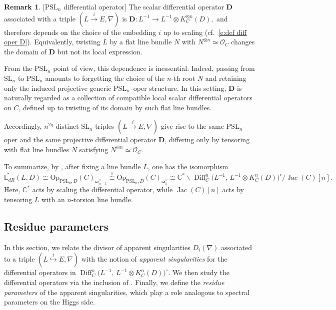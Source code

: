 \documentclass[twoside, 11pt]{article}
\numberwithin{equation}{section}
\theoremstyle{theorem}
\numberwithin{theorem}{section}
\theoremstyle{definition}
\newtheorem{remark}[remark]{Remark}
\begin{document}
\begin{remark}\label{rem-D-PSLn}[$\mathrm{PSL}_n$ differential operator]
The scalar differential operator $\mathbf D$ associated with a triple $(L\xrightarrow{i}E,\nabla)$ is 
\(
\mathbf D: L^{-1}\longrightarrow L^{-1}\otimes K_C^{\otimes n}(D),
\)
and therefore depends on the choice of the embedding $i$ up to scaling (cf.\ \eqref{e:def diff oper D}). Equivalently, twisting $L$ by a flat line bundle $N$ with $N^{\otimes n}\simeq\mathcal O_C$ changes the domain of $\mathbf D$ but not its local expression.

From the $\mathrm{PSL}_n$ point of view, this dependence is inessential. Indeed, passing from $\mathrm{SL}_n$ to $\mathrm{PSL}_n$ amounts to forgetting the choice of the $n$-th root $N$ and retaining only the induced projective generic $\mathrm{PSL}_n$--oper structure. In this setting, $\mathbf D$ is naturally regarded as a collection of compatible local scalar differential operators on $C$, defined up to twisting of its domain by such flat line bundles.

Accordingly, $n^{2g}$ distinct $\mathrm{SL}_n$-triples $(L\xrightarrow{i}E,\nabla)$ give rise to the same $\mathrm{PSL}_n$-oper and the same projective differential operator $\mathbf D$, differing only by tensoring with flat line bundles $N$ satisfying $N^{\otimes n}\simeq\mathcal O_C$.
\end{remark}

To summarize, by , after fixing a line bundle $L$, one has the isomorphism
\begin{equation}\label{e:ident spaces}
\widetilde{\mathbb{L}_{dR}}(L,D)
\cong
\mathrm{Op}_{\mathrm{PSL}_n,D}(C)_{\boldsymbol{\omega}_{n-1}^{\vee}}
\overset{\vee}{\cong}
\mathrm{Op}_{\mathrm{PSL}_n,D}(C)_{\boldsymbol{\omega}_{1}^{\vee}}
\cong
\mathbb C^{*} \backslash \operatorname{Diff}_C^{n}\!\bigl(L^{-1},\,L^{-1}\otimes K_C^{n}(D)\bigr)^\circ / \operatorname{Jac}(C)[n].
\end{equation}
Here, \(\mathbb C^{*}\) acts by scaling the differential operator, while \(\operatorname{Jac}(C)[n]\) acts by tensoring \(L\) with an \(n\)-torsion line bundle.



\subsection{Residue parameters}
In this section, we relate the divisor of apparent singularities $D_i(\nabla)$ associated to a triple $(L \overset{i}{\hookrightarrow} E, \nabla)$ with the notion of \emph{apparent singularities} for the differential operators in $\operatorname{Diff}_C^{n}\!\bigl(L^{-1},\,L^{-1}\otimes K_C^{n}(D)\bigr)^\circ$.
We then study the differential operators via the inclusion 
of . 
Finally, we define the \emph{residue parameters} of the apparent singularities, which play a role analogous to spectral parameters on the Higgs side.
\end{document}
